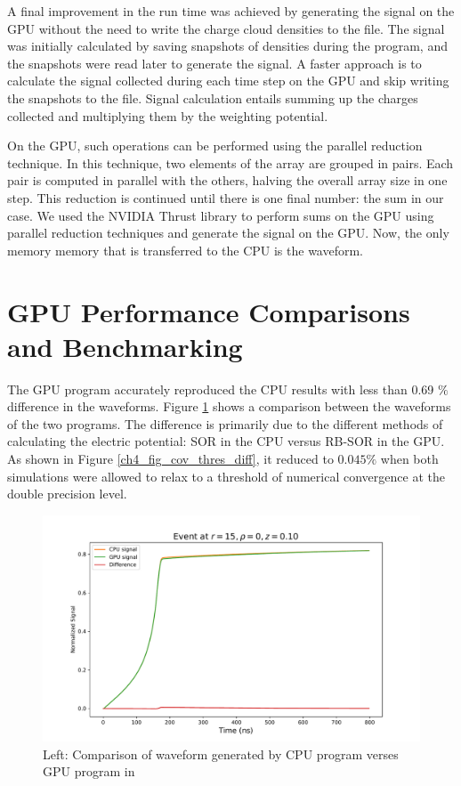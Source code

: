 A final improvement in the run time was achieved by generating the signal on the GPU without the need to write the charge cloud densities to the file. The signal was initially calculated by saving snapshots of densities during the program, and the snapshots were read later to generate the signal. A faster approach is to calculate the signal collected during each time step on the GPU and skip writing the snapshots to the file. Signal calculation entails summing up the charges collected and multiplying them by the weighting potential. 

On the GPU, such operations can be performed using the parallel reduction technique. In this technique, two elements of the array are grouped in pairs. Each pair is computed in parallel with the others, halving the overall array size in one step. This reduction is continued until there is one final number: the sum in our case. We used the NVIDIA Thrust library to perform sums on the GPU using parallel reduction techniques and generate the signal on the GPU. Now, the only memory memory that is transferred to the CPU is the waveform.

\section{GPU Performance Comparisons and Benchmarking}

The GPU program accurately reproduced the CPU results with less than 0.69 $\%$ difference in the waveforms. Figure \ref{ch4_fig_waveform_comp} shows a comparison between the waveforms of the two programs. The difference is primarily due to the different methods of calculating the electric potential: SOR in the CPU versus RB-SOR in the GPU. As shown in Figure \ref{ch4_fig_cov_thres_diff}, it reduced to $0.045\%$ when both simulations were allowed to relax to a threshold of numerical convergence at the double precision level.

\begin{figure}[!ht]
\centering
 \includegraphics[width=0.99\linewidth]{ch4/figs/cpu_gpu_wf.pdf}
\caption{ Left: Comparison of waveform generated by CPU program verses GPU program in {\ehd}}
\label{ch4_fig_waveform_comp}
\end{figure}

